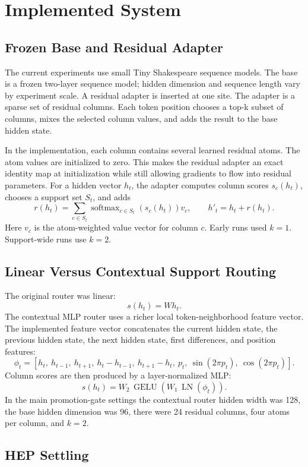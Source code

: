\documentclass[11pt]{article}
\begin{document}
\section{Implemented System}

\subsection{Frozen Base and Residual Adapter}

The current experiments use small Tiny Shakespeare sequence models. The base is
a frozen two-layer sequence model; hidden dimension and sequence length vary
by experiment scale. A residual adapter is inserted at one site. The adapter is
a sparse set of residual columns. Each token position chooses a top-k subset
of columns, mixes the selected column values, and adds the result to the base
hidden state.

In the implementation, each column contains several learned residual atoms.
The atom values are initialized to zero. This makes the residual adapter an
exact identity map at initialization while still allowing gradients to flow
into residual parameters. For a hidden vector \(h_t\), the adapter computes
column scores \(s_c(h_t)\), chooses a support set \(S_t\), and adds
\[
r(h_t) =
\sum_{c \in S_t}
\operatorname{softmax}_{c \in S_t}(s_c(h_t)) v_c,
\qquad
h'_t = h_t + r(h_t).
\]
Here \(v_c\) is the atom-weighted value vector for column \(c\). Early runs
used \(k=1\). Support-wide runs use \(k=2\).

\subsection{Linear Versus Contextual Support Routing}

The original router was linear:
\[
s(h_t) = W h_t.
\]
The contextual MLP router uses a richer local token-neighborhood feature
vector. The implemented feature vector concatenates the current hidden state,
the previous hidden state, the next hidden state, first differences, and
position features:
\[
\phi_t =
\left[
h_t,\ h_{t-1},\ h_{t+1},\ h_t-h_{t-1},\
h_{t+1}-h_t,\ p_t,\ \sin(2\pi p_t),\ \cos(2\pi p_t)
\right].
\]
Column scores are then produced by a layer-normalized MLP:
\[
s(h_t) = W_2\,\operatorname{GELU}(W_1\,\operatorname{LN}(\phi_t)).
\]
In the main promotion-gate settings the contextual router hidden width was
128, the base hidden dimension was 96, there were 24 residual columns, four
atoms per column, and \(k=2\).

\subsection{HEP Settling}
\end{document}
